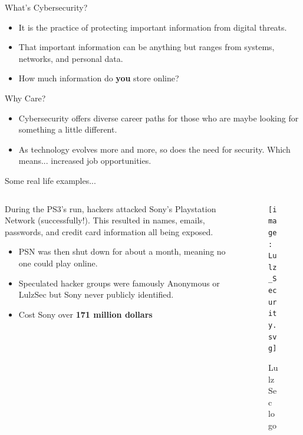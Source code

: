 \documentclass{beamer}
\begin{document}
\begin{frame}{What's Cybersecurity?}
	\begin{itemize}
		\item It is the practice of protecting important information from digital threats.
		\pause
		
		\item That important information can be anything but ranges from systems, networks, and personal data.
		\pause
		
		\item How much information do \textbf{you} store online?
	\end{itemize}
\end{frame}

\begin{frame}{Why Care?}
	\begin{itemize}
		\item Cybersecurity offers diverse career paths for those who are maybe looking for something a little different. 
		\pause
		\item As technology evolves more and more, so does the need for security. Which means... increased job opportunities.
		
	\end{itemize}
\end{frame}

\begin{frame}{Some real life examples...}
	\begin{columns}
		\begin{column}{0.5\textwidth}
			During the PS3's run, hackers attacked Sony's Playstation Network (successfully!). This resulted in names, emails, passwords, and credit card information all being exposed. 
			\pause
			\begin{itemize}
				\item PSN was then shut down for about a month, meaning no one could play online.
				\pause
				\item Speculated hacker groups were famously Anonymous or LulzSec but Sony never publicly identified. 
				\pause
				\item Cost Sony over \textbf{171 million dollars}
			\end{itemize}
		\end{column}
		\begin{column}{0.5\textwidth}
			\begin{figure}
				\centering
				\texttt{[image: Lulz\_Security.svg]}
				\caption{LulzSec logo}
				\label{fig:lulzsecurity}
			\end{figure}
		\end{column}
	\end{columns}
\end{frame}
\end{document}

